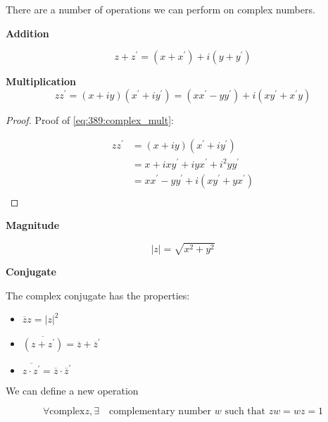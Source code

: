 \documentclass[../notes.tex]{subfiles}
\begin{document}
\begin{definition}

	There are a number of operations we can perform on complex numbers.

	\textbf{Addition} 

	\begin{equation}
		z + z^\prime = (x + x^\prime) + i(y + y^\prime)
		\label{eq:389:complex_add}
	\end{equation}


	\textbf{Multiplication} 
	\begin{equation}
		z z^\prime = (x + iy)(x^\prime + iy^\prime) = (x x^\prime - y y^\prime) + i(x y^\prime + x^\prime y)
		\label{eq:389:complex_mult}
	\end{equation}


	\begin{proof}
		Proof of \eqref{eq:389:complex_mult}:

		\begin{equation}
			\begin{split}
				zz^\prime &= (x+iy)(x^\prime + iy^\prime) \\
				 &= x + ixy^\prime + i yx^\prime + i^2yy^\prime\\
				 &= x x^\prime  - yy^\prime + i(xy^\prime + y x ^\prime) \\
			\end{split}
		\end{equation}
	\end{proof}


	\textbf{Magnitude} 

	\begin{equation}
		|z| = \sqrt{x^2 + y^2}
		\label{eq:389:complex_mag}
	\end{equation}

	\textbf{Conjugate}

	The complex conjugate has the properties:

	\begin{itemize}
		\item $ \overline{z} z = |z|^2 $ 
		\item $ \overline{(z + z^\prime)} = \overline{z} + \overline{z}^\prime$ 
		\item $ \overline{z \cdot z^\prime} = \overline{z} \cdot \overline{z}^\prime $ 
	\end{itemize}


	We can define a new operation

	\begin{equation}
		\forall \text{complex} z, \exists \quad \text{complementary number } w \text{ such that } zw = wz = 1
	\end{equation}


\end{definition}
\end{document}
